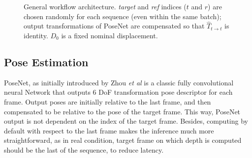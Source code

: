 \documentclass[runningheads]{llncs}
\def\etal{\emph{et al}\:}
\begin{document}
\begin{figure}
\linebreak
\caption{General workflow architecture. \textit{target} and \textit{ref} indices ($t$ and $r$) are chosen randomly for each sequence (even within the same batch); output transformations of PoseNet are compensated so that $\widehat{T}_{t \rightarrow t}$ is identity. $D_0$ is a fixed nominal displacement.}
\label{fig:process}
\end{figure}

\subsection{Pose Estimation}
PoseNet, as initially introduced by Zhou \etal \cite{zhou2017unsupervised} is a classic fully convolutional neural Network that outputs 6 DoF transformation pose descriptor for each frame.
Output poses are initially relative to the last frame, and then compensated to be relative to the pose of the target frame. This way, PoseNet output is not dependent on the index of the target frame. Besides, computing by default with respect to the last frame makes the inference much more straightforward, as in real condition, target frame on which depth is computed should be the last of the sequence, to reduce latency.
\end{document}
